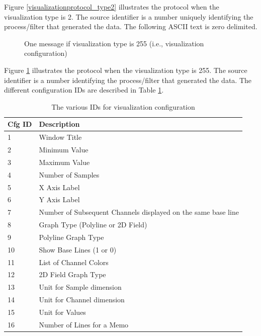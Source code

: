 \documentclass[letterpaper,oneside,12pt]{book}
\begin{document}
Figure \ref{visualizationprotocol_type2} illustrates the protocol when the 
visualization type is 2. The source identifier is a number uniquely 
identifying the process/filter that generated the data. The following ASCII
text is zero delimited.

\begin{figure}[ht]
 \centerline{}
 \caption{One message if visualization type is 255 (i.e., visualization configuration)}
 \label{visualizationprotocol_type255}
\end{figure}

Figure \ref{visualizationprotocol_type255} illustrates the protocol when the 
visualization type is 255. The source identifier is a number 
identifying the process/filter that generated the data. The different 
configuration IDs are described in Table \ref{tab:viscfg_table}.

\begin{table}[ht]
 \centering
 \begin{tabular}{|l|l|}
  \hline
  \textbf{Cfg ID} & \textbf{Description} \\
  \hline
  1 & Window Title \\
  \hline
  2 & Minimum Value \\
  \hline
  3 & Maximum Value \\
  \hline
  4 & Number of Samples \\
  \hline
  5 & X Axis Label \\
  \hline
  6 & Y Axis Label \\
  \hline
  7 & Number of Subsequent Channels displayed on the same base line \\
  \hline
  8 & Graph Type (Polyline or 2D Field) \\
  \hline
  9 & Polyline Graph Type \\
  \hline
  10 & Show Base Lines (1 or 0) \\
  \hline
  11 & List of Channel Colors \\
  \hline
  12 & 2D Field Graph Type \\
  \hline
  13 & Unit for Sample dimension \\
  \hline
  14 & Unit for Channel dimension \\
  \hline
  15 & Unit for Values \\
  \hline
  16 & Number of Lines for a Memo \\
  \hline
 \end{tabular}
 \caption{The various IDs for visualization configuration}
 \label{tab:viscfg_table}
\end{table} 
\end{document}
